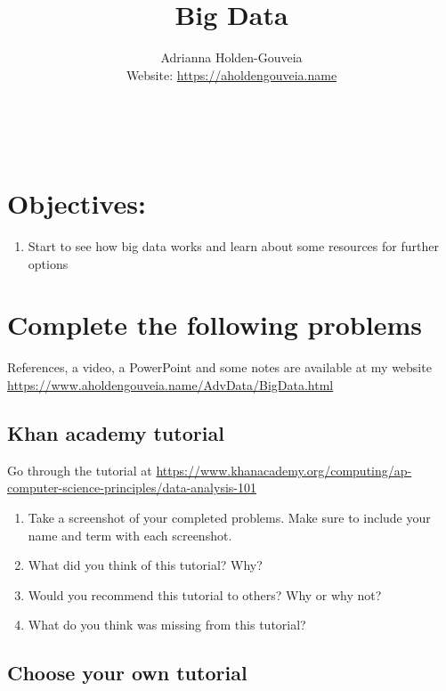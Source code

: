 \documentclass[12pt]{article}
\title{Big Data}
\author{
        Adrianna Holden-Gouveia \\
        Website: \url{https://aholdengouveia.name}\\ 
        \date{\vspace{-5ex}}
        \faLinkedin{: aholdengouveia} \\
        \faGithub {: aholdengouveia} \\
        }
\begin{document}
    

\maketitle


\section*{Objectives:}
\begin{enumerate}
    \item Start to see how big data works and learn about some resources for further options
\end{enumerate}
\section*{Complete the following problems}

References, a video, a PowerPoint and some notes are available at my website
\url {https://www.aholdengouveia.name/AdvData/BigData.html}

\subsection*{Khan academy tutorial}

Go through the tutorial at \url{https://www.khanacademy.org/computing/ap-computer-science-principles/data-analysis-101}


    \begin{enumerate}
        \item Take a screenshot of your completed problems.  Make sure to include your name and term with each screenshot. 
        \item What did you think of this tutorial? Why?
        \item Would you recommend this tutorial to others? Why or why not?
        \item What do you think was missing from this tutorial?
    \end{enumerate}

\subsection*{Choose your own tutorial}
\end{document}
